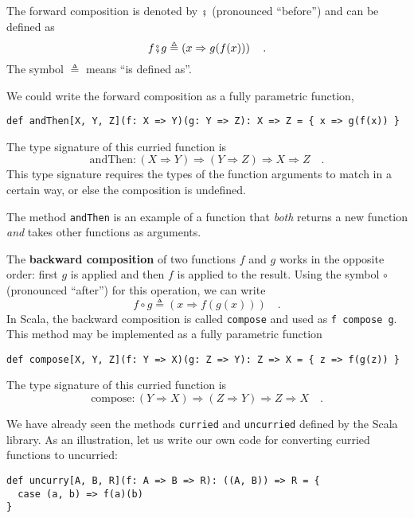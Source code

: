 The forward composition is denoted by $\bef$ (pronounced ``before'')
and can be defined as
\begin{equation}
f\bef g\triangleq\left(x\Rightarrow g(f(x))\right)\quad.\label{eq:def-of-forward-composition}
\end{equation}
The symbol $\triangleq$ means ``is defined as''.

We could write the forward composition as a fully parametric function,
\begin{lstlisting}
def andThen[X, Y, Z](f: X => Y)(g: Y => Z): X => Z = { x => g(f(x)) }
\end{lstlisting}
The type signature of this curried function is 
\[
\text{andThen}:\left(X\Rightarrow Y\right)\Rightarrow\left(Y\Rightarrow Z\right)\Rightarrow X\Rightarrow Z\quad.
\]
This type signature requires the types of the function arguments to
match in a certain way, or else the composition is undefined.

The method \lstinline!andThen! is an example of a function that \emph{both}
returns a new function \emph{and} takes other functions as arguments.

The \textbf{backward composition} of
two functions $f$ and $g$ works in the opposite order: first $g$
is applied and then $f$ is applied to the result. Using the symbol
$\circ$ (pronounced ``after'') for this operation, we can write
\begin{equation}
f\circ g\triangleq\left(x\Rightarrow f(g(x))\right)\quad.\label{eq:def-of-backward-composition}
\end{equation}
In Scala, the backward composition is called \lstinline!compose!
and used as \lstinline!f compose g!. This method may be implemented
as a fully parametric function
\begin{lstlisting}
def compose[X, Y, Z](f: Y => X)(g: Z => Y): Z => X = { z => f(g(z)) }
\end{lstlisting}
The type signature of this curried function is
\[
\text{compose}:\left(Y\Rightarrow X\right)\Rightarrow\left(Z\Rightarrow Y\right)\Rightarrow Z\Rightarrow X\quad.
\]

We have already seen the methods \lstinline!curried! and \lstinline!uncurried!
defined by the Scala library. As an illustration, let us write our
own code for converting curried functions to uncurried:
\begin{lstlisting}
def uncurry[A, B, R](f: A => B => R): ((A, B)) => R = {
  case (a, b) => f(a)(b)
}
\end{lstlisting}

